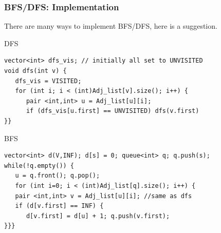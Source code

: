 \documentclass{beamer}
\begin{document}
\begin{frame}[fragile]
  \frametitle{BFS/DFS: Implementation}
  {\smaller
  There are many ways to implement BFS/DFS, here is a suggestion.

  \begin{exampleblock}{DFS}
\begin{verbatim}
vector<int> dfs_vis; // initially all set to UNVISITED
void dfs(int v) {
   dfs_vis = VISITED;
   for (int i; i < (int)Adj_list[v].size(); i++) {
      pair <int,int> u = Adj_list[u][i];
      if (dfs_vis[u.first] == UNVISITED) dfs(v.first)      
}}
\end{verbatim}
  \end{exampleblock}
  \begin{exampleblock}{BFS}
\begin{verbatim}
vector<int> d(V,INF); d[s] = 0; queue<int> q; q.push(s);
while(!q.empty()) {
   u = q.front(); q.pop();
   for (int i=0; i < (int)Adj_list[q].size(); i++) {
   pair <int,int> v = Adj_list[u][i]; //same as dfs
   if (d[v.first] == INF) {   
      d[v.first] = d[u] + 1; q.push(v.first);
}}}
\end{verbatim}
  \end{exampleblock}
  

  }
\end{frame}
\end{document}
